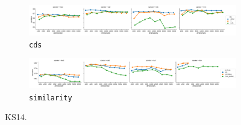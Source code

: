 \begin{figure}
  \centering

  \begin{subfigure}[t]{\textwidth}
    \includegraphics[width=1.1\textwidth]{supplement/figures/ks14-interaction-cds}

  \caption{\texttt{cds}}
  \label{fig:ks14-cds}
  \end{subfigure}

  \begin{subfigure}[t]{\textwidth}
    \includegraphics[width=1.1\textwidth]{supplement/figures/ks14-interaction-similarity}

  \caption{\texttt{similarity}}
  \label{fig:ks14-similarity}
  \end{subfigure}

  \caption{KS14.}
\end{figure}
